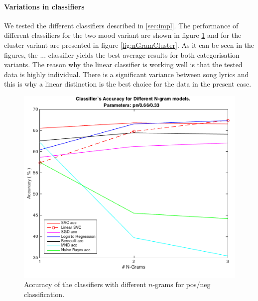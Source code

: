 \documentclass[a4paper,12pt]{article}
\begin{document}
\paragraph{Variations in classifiers} We tested the different classifiers described in \ref{sec:impl}. The performance of different classifiers for the two mood variant are shown in figure \ref{fig:nGramPosNeg} and for the cluster variant are presented in figure \ref{fig:nGramCluster}. As it can be seen in the figures, the ... classifier yields the best average results for both categorisation variants. The reason why the linear classifier is working well is that the tested data is highly individual. There is a significant variance between song lyrics and this is why a linear distinction is the best choice for the data in the present case.

\begin{figure}
\centering
\includegraphics[scale=0.5]{pl1}
\caption{Accuracy of the classifiers with different $n$-grams for pos/neg classification.}
\label{fig:nGramPosNeg}
\end{figure}
\end{document}

